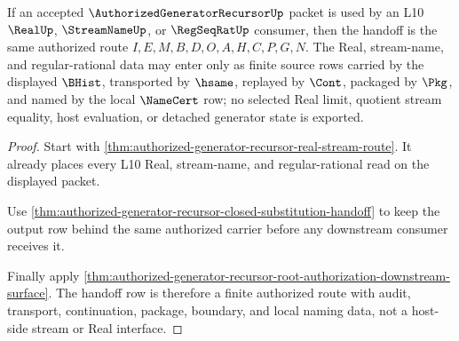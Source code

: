 \begin{theorem}
\label{thm:authorized-generator-recursor-real-stream-handoff-row}
If an accepted $\AuthorizedGeneratorRecursorUp$ packet is used by an L10 $\RealUp$, $\StreamNameUp$, or $\RegSeqRatUp$ consumer, then the handoff is the same authorized route $I,E,M,B,D,O,A,H,C,P,G,N$. The Real, stream-name, and regular-rational data may enter only as finite source rows carried by the displayed $\BHist$, transported by $\hsame$, replayed by $\Cont$, packaged by $\Pkg$, and named by the local $\NameCert$ row; no selected Real limit, quotient stream equality, host evaluation, or detached generator state is exported.
\end{theorem}
\begin{proof}
Start with \autoref{thm:authorized-generator-recursor-real-stream-route}. It already places every L10 Real, stream-name, and regular-rational read on the displayed packet.

Use \autoref{thm:authorized-generator-recursor-closed-substitution-handoff} to keep the output row behind the same authorized carrier before any downstream consumer receives it.

Finally apply \autoref{thm:authorized-generator-recursor-root-authorization-downstream-surface}. The handoff row is therefore a finite authorized route with audit, transport, continuation, package, boundary, and local naming data, not a host-side stream or Real interface.
\end{proof}

